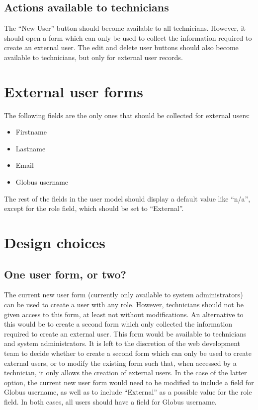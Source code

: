 \subsection{Actions available to technicians}

The ``New User'' button should become available to all technicians. However, it should
open a form which can only be used to collect the information required to create an
external user. The edit and delete user buttons should also become available to 
technicians, but only for external user records.

\section{External user forms}

The following fields are the only ones that should be collected for external users:
\begin{itemize}\itemsep1pt
    \item Firstname
    \item Lastname
    \item Email
    \item Globus username
\end{itemize}
The rest of the fields in the user model should display a default value like ``n/a'',
except for the role field, which should be set to ``External''.

\section{Design choices}

\subsection{One user form, or two?}

The current new user form (currently only available to system administrators) can be 
used to create a user with any role. However, technicians should not be given access 
to this form, at least not without modifications. An alternative to this would be to 
create a second form which only collected the information required to create an external 
user. This form would be available to technicians and system administrators.
It is left to the discretion of the web development team to decide whether to create
a second form which can only be used to create external users, or to modify the existing
form such that, when accessed by a technician, it only allows the creation of external
users. In the case of the latter option, the current new user form would need to be 
modified to include a field for Globus username, as well as to include ``External'' 
as a possible value for the role field. In both cases, all users should have a field
for Globus username.

